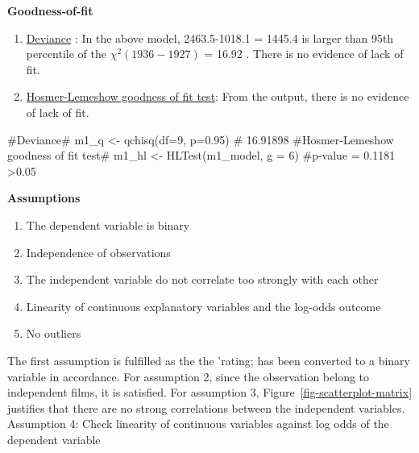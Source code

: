 \documentclass[
  letterpaper,
  DIV=11,
  numbers=noendperiod]{scrartcl}
\newenvironment{Shaded}{\begin{snugshade}}{\end{snugshade}}
\newcommand{\AttributeTok}[1]{\textcolor[rgb]{0.40,0.45,0.13}{#1}}
\newcommand{\CommentTok}[1]{\textcolor[rgb]{0.37,0.37,0.37}{#1}}
\newcommand{\DecValTok}[1]{\textcolor[rgb]{0.68,0.00,0.00}{#1}}
\newcommand{\FloatTok}[1]{\textcolor[rgb]{0.68,0.00,0.00}{#1}}
\newcommand{\FunctionTok}[1]{\textcolor[rgb]{0.28,0.35,0.67}{#1}}
\newcommand{\NormalTok}[1]{\textcolor[rgb]{0.00,0.23,0.31}{#1}}
\newcommand{\OtherTok}[1]{\textcolor[rgb]{0.00,0.23,0.31}{#1}}
\begin{document}
\textbf{Goodness-of-fit}

\begin{enumerate}
\def\labelenumi{\arabic{enumi}.}
\item
  \ul{Deviance} : In the above model, 2463.5-1018.1 = 1445.4 is larger
  than 95th percentile of the \(\chi^2(1936-1927)\) = 16.92 . There is
  no evidence of lack of fit.
\item
  \ul{Hosmer-Lemeshow goodness of fit test}: From the output, there is
  no evidence of lack of fit.
\end{enumerate}

\begin{Shaded}
\begin{Highlighting}[]
\CommentTok{\#Deviance\#}
\NormalTok{m1\_q }\OtherTok{\textless{}{-}} \FunctionTok{qchisq}\NormalTok{(}\AttributeTok{df=}\DecValTok{9}\NormalTok{, }\AttributeTok{p=}\FloatTok{0.95}\NormalTok{) }\CommentTok{\# 16.91898}
\CommentTok{\#Hosmer{-}Lemeshow goodness of fit test\#}
\NormalTok{m1\_hl }\OtherTok{\textless{}{-}} \FunctionTok{HLTest}\NormalTok{(m1\_model, }\AttributeTok{g =} \DecValTok{6}\NormalTok{) }\CommentTok{\#p{-}value = 0.1181 \textgreater{}0.05}
\end{Highlighting}
\end{Shaded}

\textbf{Assumptions}

\begin{enumerate}
\def\labelenumi{\arabic{enumi}.}
\item
  The dependent variable is binary
\item
  Independence of observations
\item
  The independent variable do not correlate too strongly with each other
\item
  Linearity of continuous explanatory variables and the log-odds outcome
\item
  No outliers
\end{enumerate}

The first assumption is fulfilled as the the 'rating; has been converted
to a binary variable in accordance. For assumption 2, since the
observation belong to independent films, it is satisfied. For assumption
3, Figure~\ref{fig-scatterplot-matrix} justifies that there are no
strong correlations between the independent variables.
\clearpage Assumption 4: Check linearity of continuous variables against
log odds of the dependent variable
\end{document}

